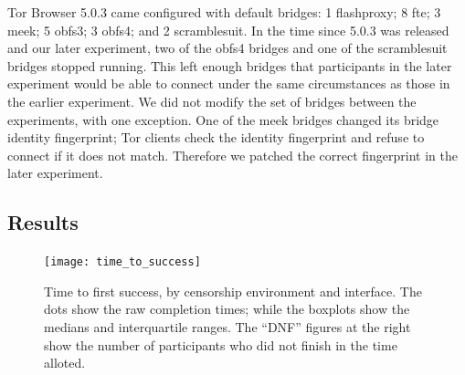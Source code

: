 \documentclass{template}
\begin{document}
Tor Browser 5.0.3 came configured with default bridges:
1 flashproxy;
8 fte;
3 meek;
5 obfs3;
3 obfs4;
and 2 scramblesuit.
In the time since 5.0.3 was released and our later experiment,
two of the obfs4 bridges and one of the scramblesuit bridges stopped running.
This left enough bridges that participants in the later experiment would be able to connect
under the same circumstances as those in the earlier experiment.
We did not modify the set of bridges between the experiments,
with one exception.
One of the meek bridges changed its bridge identity fingerprint;
Tor clients check the identity fingerprint and refuse to connect
if it does not match.
Therefore we patched the correct fingerprint in the later experiment.

\subsection{Results} 

\begin{figure}
\centering
\texttt{[image: time\_to\_success]}
\caption{
Time to first success, by censorship environment and interface.
The dots show the raw completion times;
while the boxplots show the medians and interquartile ranges.
The ``DNF'' figures at the right
show the number of participants who did not finish
in the time alloted.
}
\end{figure}
\end{document}
